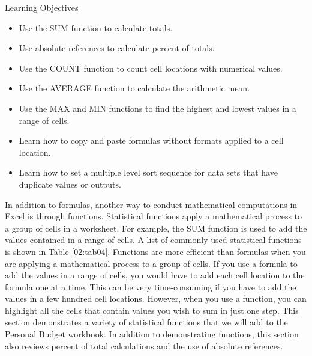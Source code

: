 \begin{center}
	\begin{objbox}{Learning Objectives}
		\begin{itemize}
			\setlength{\itemsep}{0pt}
			\setlength{\parskip}{0pt}
			\setlength{\parsep}{0pt}
			
			\item Use the SUM function to calculate totals.
			\item Use absolute references to calculate percent of totals.
			\item Use the COUNT function to count cell locations with numerical values.
			\item Use the AVERAGE function to calculate the arithmetic mean.
			\item Use the MAX and MIN functions to find the highest and lowest values in a range of cells.
			\item Learn how to copy and paste formulas without formats applied to a cell location.
			\item Learn how to set a multiple level sort sequence for data sets that have duplicate values or outputs.
			
 		\end{itemize}
	\end{objbox}
\end{center}

In addition to formulas, another way to conduct mathematical computations in Excel is through functions. Statistical functions apply a mathematical process to a group of cells in a worksheet. For example, the SUM function is used to add the values contained in a range of cells. A list of commonly used statistical functions is shown in Table \ref{02:tab04}. Functions are more efficient than formulas when you are applying a mathematical process to a group of cells. If you use a formula to add the values in a range of cells, you would have to add each cell location to the formula one at a time. This can be very time-consuming if you have to add the values in a few hundred cell locations. However, when you use a function, you can highlight all the cells that contain values you wish to sum in just one step. This section demonstrates a variety of statistical functions that we will add to the Personal Budget workbook. In addition to demonstrating functions, this section also reviews percent of total calculations and the use of absolute references.

